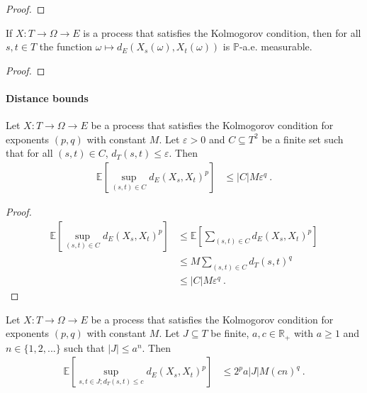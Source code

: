 \begin{proof}\leanok

\end{proof}


\begin{lemma}\label{lem:IsKolmogorovProcess.aemeasurable_edist}
  \mathlibok
If $X : T \to \Omega \to E$ is a process that satisfies the Kolmogorov condition, then for all $s,t \in T$ the function $\omega \mapsto d_E(X_s(\omega), X_t(\omega))$ is $\mathbb{P}$-a.e. measurable.
\end{lemma}

\begin{proof}\leanok

\end{proof}

\paragraph{Distance bounds}

\begin{lemma}\label{lem:integral_sup_rpow_dist_le_card_mul_rpow}
  \leanok
Let $X : T \to \Omega \to E$ be a process that satisfies the Kolmogorov condition for exponents $(p,q)$ with constant $M$.
Let $\varepsilon > 0$ and $C \subseteq T^2$ be a finite set such that for all $(s, t) \in C$, $d_T(s, t) \le \varepsilon$.
Then
\begin{align*}
  \mathbb{E}\left[\sup_{(s,t) \in C} d_E(X_s, X_t)^p \right]
  &\le \vert C \vert M \varepsilon^q
  \: .
\end{align*}
\end{lemma}

\begin{proof}\leanok
\begin{align*}
  \mathbb{E}\left[\sup_{(s,t) \in C} d_E(X_s, X_t)^p \right]
  &\le \mathbb{E}\left[\sum_{(s,t) \in C} d_E(X_s, X_t)^p \right]
  \\
  &\le M \sum_{(s,t) \in C} d_T(s, t)^q
  \\
  &\le \vert C \vert M \varepsilon^q
  \: .
\end{align*}
\end{proof}


\begin{lemma}\label{lem:integral_sup_rpow_dist_of_dist_le}
  \leanok
Let $X : T \to \Omega \to E$ be a process that satisfies the Kolmogorov condition for exponents $(p,q)$ with constant $M$.
Let $J \subseteq T$ be finite, $a, c \in \mathbb R_+$ with $a \ge 1$ and $n \in \{1, 2, ...\}$ such that $|J| \le a^n$.
Then
\begin{align*}
  \mathbb{E} \left[ \sup_{s, t \in J; d_T(s, t) \le c} d_E(X_s, X_t)^p \right]
  &\le 2^p a |J| M (cn)^q
  \: .
\end{align*}
\end{lemma}

